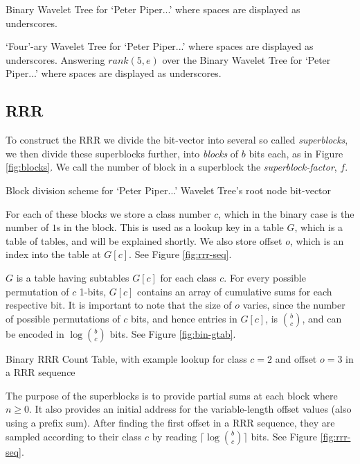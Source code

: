 			{Binary Wavelet Tree for `Peter Piper...' where spaces are displayed
			as underscores.}
			
			{`Four'-ary Wavelet Tree for `Peter Piper...' where spaces are 
			displayed as underscores.}
\clearpage
			{Answering $rank(5, e)$ over the Binary Wavelet Tree for `Peter
			Piper...' where spaces are displayed as underscores.}

\subsection{RRR}
To construct the RRR we divide the bit-vector into several so called 
\emph{superblocks}, we then divide these superblocks further, into 
\emph{blocks} of $b$ bits each, as in Figure \ref{fig:blocks}. We call the 
number of block in a superblock the \emph{superblock-factor}, $f$.

			{Block division scheme for `Peter Piper...' Wavelet Tree's root
			node bit-vector}

For each of these blocks we store a class number $c$, which in the binary case 
is the number of  $1$s in the block. This is used as a lookup key in a table 
$G$, which is a table of tables, and will be explained shortly. We also store 
offset $o$, which is an index into the table at $G[c]$. See Figure 
\ref{fig:rrr-seq}.

$G$ is a table having subtables $G[c]$ for each class $c$. For every possible 
permutation of $c$ 1-bits, $G[c]$ contains an array of cumulative sums for each 
respective bit. It is important to note that the size of $o$ varies, since 
the number of possible permutations of $c$ bits, and hence entries in $G[c]$, is $b \choose c$, and can be encoded in $\log {b \choose c}$ bits. See Figure \ref{fig:bin-gtab}.

			{Binary RRR Count Table, with example lookup for class $c = 2$
			and offset $o = 3$ in a RRR sequence}

The purpose of the superblocks is to provide partial sums at each block where $n 
\ge 0$. It also provides an initial address for the variable-length offset 
values (also using a prefix sum). After finding the first offset in a RRR
sequence, they are sampled according to their class $c$ by reading $\lceil\log 
{b \choose c}\rceil$ bits. See Figure \ref{fig:rrr-seq}.

